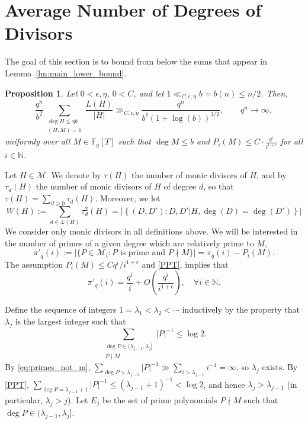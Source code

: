 \documentclass[12pt]{amsart}
\numberwithin{equation}{section}
\newtheorem{proposition}[theorem]{Proposition}
\theoremstyle{definition}
\theoremstyle{remark}
\newcommand{\FF}{\mathbb{F}}
\newcommand{\NN}{\mathbb{N}}
\newcommand{\ps}[1]{\left( #1 \right)}
\begin{document}
\section{Average Number of Degrees of Divisors} \label{sec:avg_deg_div}
The goal of this section is to bound from below the sums that appear in Lemma~\ref{lm:main_lower_bound}.
\begin{proposition}\label{lower_bound}
    Let $0<\epsilon, \eta$, $0<C$, and let $1 \ll_{C,\epsilon,\eta} b=b(n)\leq n/2$. Then,
    \[
        \frac{q^{n}}{b^2} \sum_{\substack{ \deg H \leq \eta b \\ (H,M)=1}}  \frac{L(H)}{|H|} \gg_{C,\epsilon, \eta} \frac{q^n}{b^\delta(1+\log(b))^{3/2}}, \qquad q^n \to \infty,
    \]
    uniformly over all $M\in \FF_q[T]$ such that $\deg M \leq b$ and $P_i(M)\leq C \cdot \frac{q^{i}}{i^{1+\epsilon}}$ for all $i\in\NN$.
\end{proposition}




Let $H \in \mathcal{M}$. We denote by $\tau(H)$ the number of monic divisors of $H$, and by $\tau_d(H)$ the number of monic divisors of $H$ of degree $d$, so that $\tau(H) = \sum_{d\geq 0} \tau_d(H)$. Moreover, we let
\begin{equation}\label{eq:W(H) def}
    W(H) := \sum_{d\in \mathcal{L}(H)} \tau_d^2(H) = |\left\{(D,D'):D,D'|H, \deg (D) = \deg (D') \right\} |
\end{equation}
We consider only monic divisors in all definitions above.
We will be interested in the number of primes of a given degree which are relatively prime to $M$, 
\[ 
    \pi'_q(i) := |\{ P \in \mathcal{M}_i : P \mbox{ is prime and } P \nmid M \}| = \pi_q(i)-P_i(M).
\]
The assumption $P_i(M)\leq Cq^{i}/i^{1+\epsilon}$ and \eqref{PPT}, implies that 
\begin{equation}\label{eq:primes_not_m}
    \pi'_q(i) = \frac{q^i}{i} + O\ps{\frac{q^i}{i^{1+\epsilon}}}, \quad  \forall i\in \NN.
\end{equation}

Define the sequence of integers $1=\lambda_1 < \lambda_2<\cdots $ inductively by the property that $\lambda_j$ is the largest integer such that 
\begin{equation}\label{eqn:Ebound}
    \sum_{\substack{\deg P\in (\lambda_{j-1},\lambda_j] \\ P \nmid M}}|P|^{-1}\leq \log 2.
\end{equation}
By \eqref{eq:primes_not_m}, $\displaystyle\sum_{\deg P>\lambda_{j-1}}|P|^{-1} \gg \sum_{i>\lambda_{j-1} }i^{-1}=\infty$, so $\lambda_j$ exists. By \eqref{PPT}, $\displaystyle\sum_{\deg P = \lambda_{j-1}+1} |P|^{-1} \leq (\lambda_{j-1}+1)^{-1}< \log 2$, and hence $\lambda_j>\lambda_{j-1}$ (in particular, $\lambda_j>j$). 
Let $E_j$ be the set of prime polynomials $P\nmid M$ such that $\deg P\in (\lambda_{j-1},\lambda_{j}]$.
\end{document}
